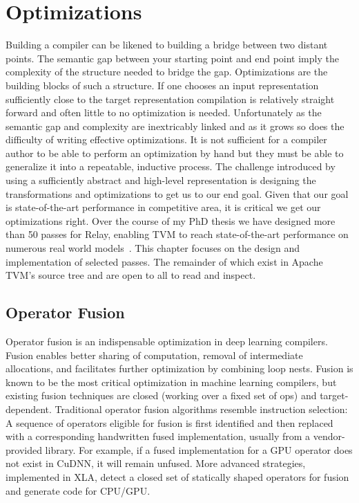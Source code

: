 \chapter{Optimizations}
\label{ch:optimizations}

Building a compiler can be likened to building a bridge between
    two distant points.
The semantic gap between your starting point and end point imply the
    complexity of the structure needed to bridge the gap.
Optimizations are the building blocks of such a structure.
If one chooses an input representation sufficiently close to
    the target representation compilation is relatively straight forward
    and often little to no optimization is needed.
Unfortunately as the semantic gap and complexity are inextricably linked
    and as it grows so does the difficulty of writing effective optimizations.
It is not sufficient for a compiler author to be able to perform an
    optimization by hand but they must be able to generalize it into
    a repeatable, inductive process.
The challenge introduced by using a sufficiently abstract and high-level
    representation is designing the transformations and optimizations
    to get us to our end goal.
Given that our goal is state-of-the-art performance in competitive
    area, it is critical we get our optimizations right.
Over the course of my PhD thesis we have designed more than 50 passes
    for Relay, enabling TVM to reach state-of-the-art performance
    on numerous real world models~\citep{huggingface_octoml}.
This chapter focuses on the design and implementation of selected passes.
The remainder of which exist in Apache TVM's source tree
  and are open to all to read and inspect.

\section{Operator Fusion}
\label{sec:fusion}

Operator fusion is an indispensable optimization in deep learning compilers.
Fusion enables better sharing of computation, removal of
  intermediate allocations, and facilitates further optimization by
  combining loop nests.
Fusion is known to be the most critical optimization in machine
  learning compilers, but existing fusion techniques
  are closed (working over a fixed set of ops)
  and target-dependent.
Traditional operator fusion algorithms resemble instruction
  selection:
A sequence of operators eligible
  for fusion is first identified and then replaced with a corresponding
  handwritten fused implementation, usually from a vendor-provided library.
For example, if a fused implementation for a GPU operator does not exist in CuDNN,
  it will remain unfused.
More advanced strategies, implemented in XLA, detect a
  closed set of statically shaped operators for fusion and
  generate code for CPU/GPU.

